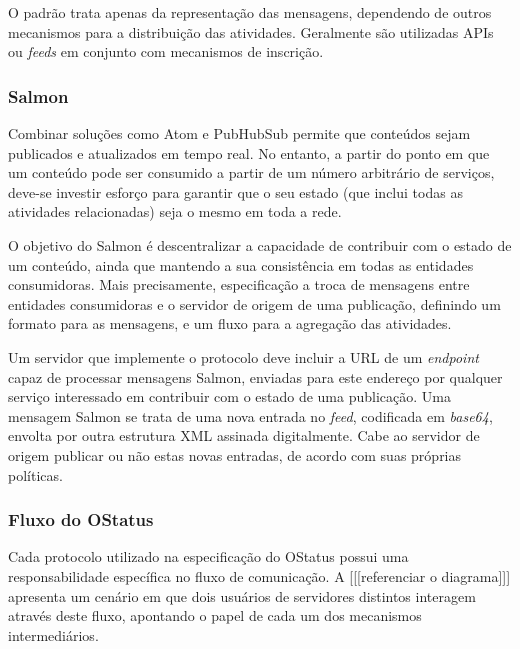 O padrão trata apenas da representação das mensagens, dependendo de outros
mecanismos para a distribuição das atividades. Geralmente são utilizadas APIs ou
\textit{feeds} em conjunto com mecanismos de inscrição.

\subsubsection{Salmon}

Combinar soluções como Atom e PubHubSub permite que conteúdos sejam publicados e
atualizados em tempo real. No entanto, a partir do ponto em que um conteúdo pode ser
consumido a partir de um número arbitrário de serviços, deve-se investir esforço
para garantir que o seu estado (que inclui todas as atividades relacionadas) seja o
mesmo em toda a rede.

O objetivo do Salmon é descentralizar a capacidade de contribuir com o estado de um
conteúdo, ainda que mantendo a sua consistência em todas as entidades consumidoras.
Mais precisamente, especificação a troca de mensagens entre entidades consumidoras
e o servidor de origem de uma publicação, definindo um formato para as mensagens, e
um fluxo para a agregação das atividades.

Um servidor que implemente o protocolo deve incluir a URL de um \textit{endpoint}
capaz de processar mensagens Salmon, enviadas para este endereço por qualquer
serviço interessado em contribuir com o estado de uma publicação. Uma mensagem
Salmon se trata de uma nova entrada no \textit{feed}, codificada em \textit{base64},
envolta por outra estrutura XML assinada digitalmente. Cabe ao servidor de origem
publicar ou não estas novas entradas, de acordo com suas próprias políticas.

\subsubsection{Fluxo do OStatus}

Cada protocolo utilizado na especificação do OStatus possui uma responsabilidade
específica no fluxo de comunicação. A [[[referenciar o diagrama]]] apresenta um
cenário em que dois usuários de servidores distintos interagem através deste fluxo,
apontando o papel de cada um dos mecanismos intermediários.


